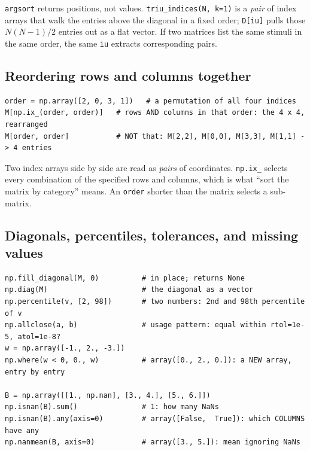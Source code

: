 \documentclass[11pt]{article}
\begin{document}
\texttt{argsort} returns positions, not values. \texttt{triu\_indices(N, k=1)} is a
\emph{pair} of index arrays that walk the entries above the diagonal in a fixed order;
\texttt{D[iu]} pulls those $N(N-1)/2$ entries out as a flat vector. If two matrices list
the same stimuli in the same order, the same \texttt{iu} extracts corresponding pairs.

\subsection{Reordering rows and columns together}\label{sec:ix}

\begin{codebox}
\begin{verbatim}
order = np.array([2, 0, 3, 1])   # a permutation of all four indices
M[np.ix_(order, order)]   # rows AND columns in that order: the 4 x 4, rearranged
M[order, order]           # NOT that: M[2,2], M[0,0], M[3,3], M[1,1] -> 4 entries
\end{verbatim}
\end{codebox}

Two index arrays side by side are read as \emph{pairs} of coordinates. \texttt{np.ix\_}
selects every combination of the specified rows and columns, which is what ``sort the
matrix by category'' means. An \texttt{order} shorter than the matrix selects a
sub-matrix.

\subsection{Diagonals, percentiles, tolerances, and missing values}

\begin{codebox}
\begin{verbatim}
np.fill_diagonal(M, 0)          # in place; returns None
np.diag(M)                      # the diagonal as a vector
np.percentile(v, [2, 98])       # two numbers: 2nd and 98th percentile of v
np.allclose(a, b)               # usage pattern: equal within rtol=1e-5, atol=1e-8?
w = np.array([-1., 2., -3.])
np.where(w < 0, 0., w)          # array([0., 2., 0.]): a NEW array, entry by entry

B = np.array([[1., np.nan], [3., 4.], [5., 6.]])
np.isnan(B).sum()               # 1: how many NaNs
np.isnan(B).any(axis=0)         # array([False,  True]): which COLUMNS have any
np.nanmean(B, axis=0)           # array([3., 5.]): mean ignoring NaNs
\end{verbatim}
\end{codebox}
\end{document}
